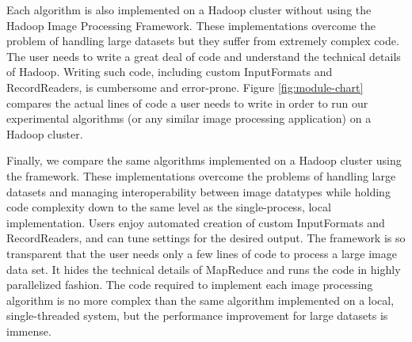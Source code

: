 \documentclass{osuthesis}
\begin{document}
				Each algorithm is also implemented on a Hadoop cluster without using
				the Hadoop Image Processing Framework.  These implementations overcome
				the problem of handling large datasets but they suffer from extremely
				complex code.  The user needs to write a great deal of code and
				understand the technical details of Hadoop. Writing such code,
				including custom InputFormats and RecordReaders, is cumbersome and
				error-prone. Figure \ref{fig:module-chart} compares the actual lines of
				code a user needs to write in order to run our experimental algorithms
				(or any similar image processing application) on a Hadoop cluster.
				
				Finally, we compare the same algorithms implemented on a Hadoop
				cluster using the framework.  These implementations overcome the
				problems of handling large datasets and managing interoperability
				between image datatypes while holding code complexity down to the same
				level as the single-process, local implementation.  Users enjoy
				automated creation of custom InputFormats and RecordReaders, and can
				tune settings for the desired output.  The framework is so transparent
				that the user needs only a few lines of code to process a large image
				data set. It hides the technical details of MapReduce and runs the
				code in highly parallelized fashion.  The code required to implement
				each image processing algorithm is no more complex than the same
				algorithm implemented on a local, single-threaded system, but the
				performance improvement for large datasets is immense.
				
\end{document}
